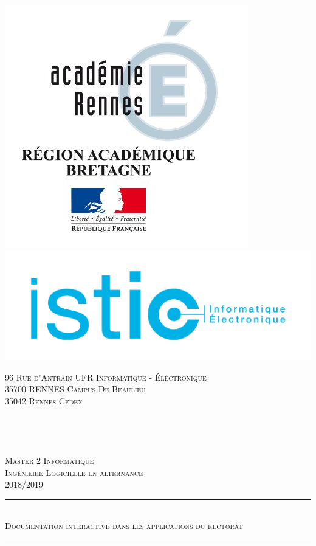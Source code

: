 \documentclass[12pt]{article}
\begin{document}
\begin{titlepage}
	
    \vspace*{0.0 cm}
    \begin{flushleft}
    
    \includegraphics  [scale = 0.6] {diagrammes/logo_Rectorat.jpg}\includegraphics  [scale = 0.1] {diagrammes/lo.png}
    \end{flushleft}
    \textsc{96 Rue d'Antrain}\hspace{100 pt}\textsc{ UFR Informatique - Électronique }\\
    \hspace{20 pt}\textsc{35700 RENNES }\hspace{200 pt}\textsc{Campus De Beaulieu}\\
    \hspace{289 pt}\textsc{35042 Rennes Cedex}\\
   \\
   \\
   \\
   \\
 	\centering   %
	\textsc{\large Master 2 Informatique}\\
		\textsc{\large Ingénierie Logicielle en alternance}\\
		\textsc{\large 2018/2019}\\
	\rule{\linewidth}{0.7 mm} \\[0.2 cm]
	\textsc{\large Documentation interactive dans les applications du rectorat}\\
	\rule{\linewidth}{0.2 mm} \\[0.2 cm]


\end{titlepage}
\end{document}

